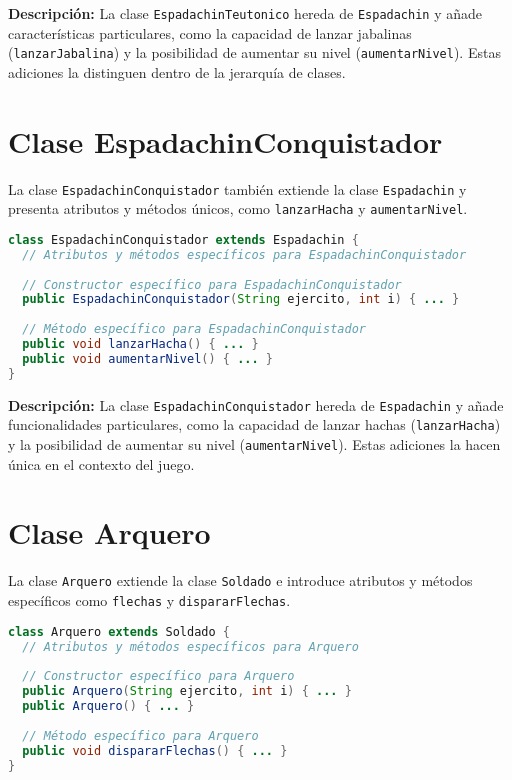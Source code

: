 \textbf{Descripción:} La clase \texttt{EspadachinTeutonico} hereda de \texttt{Espadachin} y añade características particulares, como la capacidad de lanzar jabalinas (\texttt{lanzarJabalina}) y la posibilidad de aumentar su nivel (\texttt{aumentarNivel}). Estas adiciones la distinguen dentro de la jerarquía de clases.

\section{Clase EspadachinConquistador}

La clase \texttt{EspadachinConquistador} también extiende la clase \texttt{Espadachin} y presenta atributos y métodos únicos, como \texttt{lanzarHacha} y \texttt{aumentarNivel}.

\begin{lstlisting}[language=Java]
class EspadachinConquistador extends Espadachin {
  // Atributos y métodos específicos para EspadachinConquistador
  
  // Constructor específico para EspadachinConquistador
  public EspadachinConquistador(String ejercito, int i) { ... }
  
  // Método específico para EspadachinConquistador
  public void lanzarHacha() { ... }
  public void aumentarNivel() { ... }
}
\end{lstlisting}

\textbf{Descripción:} La clase \texttt{EspadachinConquistador} hereda de \texttt{Espadachin} y añade funcionalidades particulares, como la capacidad de lanzar hachas (\texttt{lanzarHacha}) y la posibilidad de aumentar su nivel (\texttt{aumentarNivel}). Estas adiciones la hacen única en el contexto del juego.

\section{Clase Arquero}

La clase \texttt{Arquero} extiende la clase \texttt{Soldado} e introduce atributos y métodos específicos como \texttt{flechas} y \texttt{dispararFlechas}.

\begin{lstlisting}[language=Java]
class Arquero extends Soldado {
  // Atributos y métodos específicos para Arquero
  
  // Constructor específico para Arquero
  public Arquero(String ejercito, int i) { ... }
  public Arquero() { ... }
  
  // Método específico para Arquero
  public void dispararFlechas() { ... }
}
\end{lstlisting}

